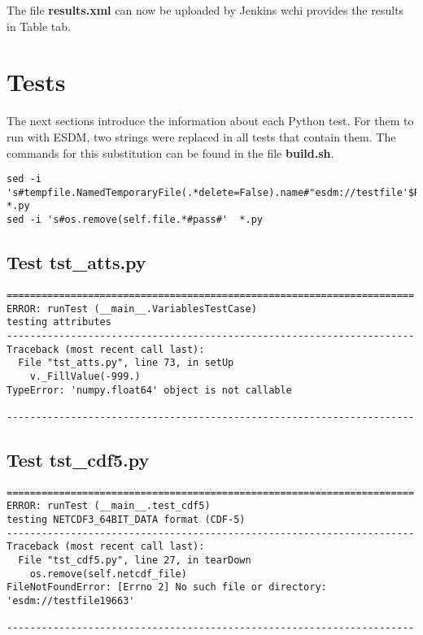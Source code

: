 The file \textbf{results.xml} can now be uploaded by Jenkins wchi provides the results in Table tab.

\section{Tests}

\tab
The next sections introduce the information about each Python test. For them to run with ESDM, two strings were replaced in all tests that contain them. The commands for this substitution can be found in the file \textbf{build.sh}.

\begin{verbatim}
sed -i 's#tempfile.NamedTemporaryFile(.*delete=False).name#"esdm://testfile'$RANDOM'"#'  *.py
sed -i 's#os.remove(self.file.*#pass#'  *.py
\end{verbatim}

\subsection{Test tst\_atts.py}

\begin{verbatim}
======================================================================
ERROR: runTest (__main__.VariablesTestCase)
testing attributes
----------------------------------------------------------------------
Traceback (most recent call last):
  File "tst_atts.py", line 73, in setUp
    v._FillValue(-999.)
TypeError: 'numpy.float64' object is not callable

----------------------------------------------------------------------
\end{verbatim}

\subsection{Test tst\_cdf5.py}

\begin{verbatim}
======================================================================
ERROR: runTest (__main__.test_cdf5)
testing NETCDF3_64BIT_DATA format (CDF-5)
----------------------------------------------------------------------
Traceback (most recent call last):
  File "tst_cdf5.py", line 27, in tearDown
    os.remove(self.netcdf_file)
FileNotFoundError: [Errno 2] No such file or directory: 'esdm://testfile19663'

----------------------------------------------------------------------
\end{verbatim}

